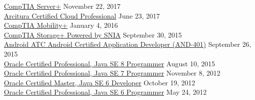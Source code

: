 \documentclass[10pt]{res} %
\begin{document}
\begin{resume}
\phantom{0}{[9]} \phantom{0}\href{https://www.credly.com/badges/5306837b-0831-4a6e-a85f-387c3dceb1cb}{\color{blue}CompTIA Server+} \hfill November 22, 2017 \\
\phantom{0}{[8]} \phantom{0}\href{https://www.credly.com/badges/d71af3b8-b7ac-4667-8d81-e42b99de6380}{\color{blue}Arcitura Certified Cloud Professional} \hfill June 23, 2017 \\
\phantom{0}{[7]} \phantom{0}\href{https://bjdelacruz.dev/files/CompTIA_MobilityPlus_Certified.pdf}{\color{blue}CompTIA Mobility+} \hfill January 4, 2016 \\
\phantom{0}{[6]} \phantom{0}\href{https://bjdelacruz.dev/files/CompTIA_StoragePlus_Certified.pdf}{\color{blue}CompTIA Storage+ Powered by SNIA} \hfill September 30, 2015 \\
\phantom{0}{[5]} \phantom{0}\href{https://androidatc.com/_transcript.php?action=public&u=ksuc1NfjztZglJacwtHW5%2Bmpy5%2BRmpyP0dPf}{\color{blue}Android ATC Android Certified Application Developer (AND-401)} \hfill September 26, 2015 \\
\phantom{0}{[4]} \phantom{0}\href{https://catalog-education.oracle.com/pls/certview/sharebadge?id=6EEFFDDE0F96A660F5E7E359162CE8ED8D3FDCF8A8534BAE5EDDB9311C7AC70E}{\color{blue}Oracle Certified Professional, Java SE 8 Programmer} \hfill August 10, 2015 \\
\phantom{0}{[3]} \phantom{0}\href{https://www.credly.com/badges/24c6085c-1307-4882-bfb9-202e49bb418c}{\color{blue}Oracle Certified Professional, Java SE 7 Programmer} \hfill November 8, 2012 \\
\phantom{0}{[2]} \phantom{0}\href{https://www.credly.com/badges/7cb3e075-f9d4-47ae-a5d3-9ba4539f9ece}{\color{blue}Oracle Certified Master, Java SE 6 Developer} \hfill October 19, 2012 \\
\phantom{0}{[1]} \phantom{0}\href{https://www.credly.com/badges/f5da6115-bd53-4d56-b266-954dd4b8ad0d}{\color{blue}Oracle Certified Professional, Java SE 6 Programmer} \hfill May 24, 2012


\vspace{0.025in}

\colorbox{darkblue}{}


\end{resume}
\end{document}
